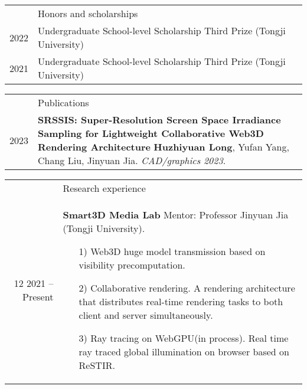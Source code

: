 \documentclass[letterpaper, 11pt]{article}
\newcommand{\headingfont}{\Large\color{OliveGreen}}
\newenvironment{SectionTable}[1]{
	\renewcommand*{\arraystretch}{1.7}
	\setlength{\tabcolsep}{10pt}
	\begin{longtable}{Rp{5.2in}} & #1 \\}
{\end{longtable}\vspace{-.3cm}}
\newenvironment{SectionTableSingleSpace}[1]{
	\renewcommand*{\arraystretch}{1.2}
	\setlength{\tabcolsep}{10pt}
	\begin{longtable}{Rp{5.2in}} & #1 \\[0.6em]}
{\end{longtable}\vspace{-.3cm}}
\begin{document}

\begin{SectionTableSingleSpace}{\headingfont Honors and scholarships}


    2022 &
    Undergraduate School-level Scholarship Third Prize (Tongji University) \\

    2021 &
    Undergraduate School-level Scholarship Third Prize (Tongji University)
\end{SectionTableSingleSpace}


\begin{SectionTable}{\headingfont Publications}
    2023 &
    \textbf{SRSSIS: Super-Resolution Screen Space Irradiance Sampling for Lightweight Collaborative Web3D Rendering Architecture} \newline
    \textbf{Huzhiyuan Long}, Yufan Yang, Chang Liu, Jinyuan Jia. \newline
    \textit{CAD/graphics 2023}. \\


\end{SectionTable}


\begin{SectionTable}{\headingfont Research experience}
    12 2021 -- Present &
    \textbf{Smart3D Media Lab} \newline
    Mentor: Professor Jinyuan Jia (Tongji University). \newline
    \begin{itemize}
        \item [1)]
              Web3D huge model transmission based on visibility precomputation.
        \item [2)]
              Collaborative rendering. A rendering architecture that distributes real-time rendering tasks to both client and server simultaneously.
        \item [3)]
              Ray tracing on WebGPU(in process). Real time ray traced global illumination on browser based on ReSTIR.
    \end{itemize} \\

\end{SectionTable}
\end{document}
